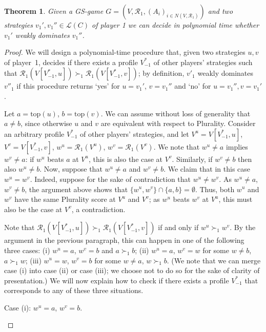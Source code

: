 \documentclass[11pt]{article}
\newtheorem{theorem}{Theorem}%
\newcommand{\calR}{\mathcal{R}}
\newcommand{\calL}{\mathcal{L}}
\newcommand{\tp}{\mathrm{top}}
\begin{document}
\begin{theorem}\label{thm:plur}
Given a GS-game $G=(V, \calR_1, (A_i)_{i\in N(V, \calR_1)})$
and two strategies $v_1', v_1''\in\calL(C)$ of player 1 we can decide in polynomial time
whether $v_1'$ weakly dominates $v_1''$.
\end{theorem}
\begin{proof}
We will design a polynomial-time procedure that, given two strategies $u, v$ of player~1,
decides if there exists a profile $V^*_{-1}$
of other players' strategies such that $\calR_1(V[V^*_{-1}, u])\succ_1 \calR_1(V[V^*_{-1}, v])$;
by definition, $v'_1$ weakly dominates $v''_1$ if this procedure returns `yes' for $u=v_1'$, $v=v_1''$
and `no' for $u=v_1'', v=v_1'$.
 
Let $a=\tp(u)$, $b=\tp(v)$. We can assume without loss of generality that $a\neq b$, 
since otherwise $u$ and $v$ are equivalent with respect to Plurality. 
Consider an arbitrary profile $V^*_{-1}$ of other players'
strategies, and let $V^u=V[V^*_{-1}, u]$, $V^v=V[V^*_{-1}, v]$, $w^u=\calR_1(V^u)$, $w^v=\calR_1(V^v)$. 
We note that $w^u\neq a$ implies $w^v\neq a$:
if $w^u$ beats $a$ at $V^u$, this is also the case at $V^v$. Similarly, 
if $w^v\neq b$ then also $w^u\neq b$. Now, suppose that 
$w^u\neq a$ and $w^v\neq b$. We claim that in this case $w^u=w^v$.
Indeed, suppose for the sake of contradiction that
$w^u\neq w^v$. As $w^u\neq a$, $w^v\neq b$, the argument above shows that $\{w^u, w^v\}\cap \{a, b\}=\emptyset$.
Thus, both $w^u$ and $w^v$ have the same Plurality score at $V^u$ and $V^v$; as $w^u$ beats $w^v$
at $V^u$, this must also be the case at $V^v$, a contradiction.

Note that $\calR_1(V[V^*_{-1}, u])\succ_1 \calR_1(V[V^*_{-1}, v])$ 
if and only if $w^u\succ_1 w^v$. By the argument in the previous paragraph, 
this can happen in one of the following three cases:
(i)   $w^u=a$, $w^v=b$ and $a\succ_1 b$;
(ii)  $w^u=a$, $w^v=w$ for some $w\neq b$, $a\succ_1 w$;
(iii) $w^u=w$, $w^v=b$ for some $w\neq a$, $w\succ_1 b$.
(We note that we can merge case (i) into case (ii) or case (iii);
we choose not to do so for the sake of clarity of presentation.)
We will now explain how to check if there exists a profile $V^*_{-1}$
that corresponds to any of these three situations.

\begin{description}
\item
Case (i): $w^u=a$, $w^v=b$. 


\end{description}
\end{proof}
\end{document}
